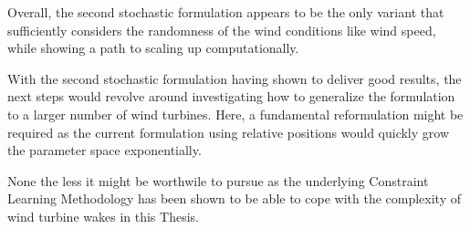 \documentclass[preprint,12pt]{elsarticle}
\begin{document}
Overall, the second stochastic formulation appears to be the only variant that sufficiently considers the randomness of the wind conditions like wind speed, while showing a path to scaling up computationally.

With the second stochastic formulation having shown to deliver good results, the next steps would revolve around investigating how to generalize the formulation to a larger number of wind turbines. Here, a fundamental reformulation might be required as the current formulation using relative positions would quickly grow the parameter space exponentially. 

None the less it might be worthwile to pursue as the underlying Constraint Learning Methodology has been shown to be able to cope with the complexity of wind turbine wakes in this Thesis.
\end{document}
